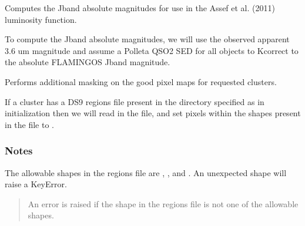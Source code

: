 \documentclass[letterpaper,12pt,english]{sphinxmanual}
\begin{document}
\begin{fulllineitems}
\begin{fulllineitems}
\label{\detokenize{api/selector:SPTclIRAGN.Pipeline_functions.SelectIRAGN.j_band_abs_mag}}
\pysigstartsignatures
{}
\pysigstopsignatures
\sphinxAtStartPar
Computes the J\sphinxhyphen{}band absolute magnitudes for use in the Assef et al. (2011) luminosity function.

\sphinxAtStartPar
To compute the J\sphinxhyphen{}band absolute magnitudes, we will use the observed apparent 3.6 um magnitude and assume a
Polleta  QSO2 SED for all objects to K\sphinxhyphen{}correct to the absolute FLAMINGOS J\sphinxhyphen{}band magnitude.

\end{fulllineitems}


\begin{fulllineitems}
\label{\detokenize{api/selector:SPTclIRAGN.Pipeline_functions.SelectIRAGN.object_mask}}
\pysigstartsignatures
{}
\pysigstopsignatures
\sphinxAtStartPar
Performs additional masking on the good pixel maps for requested clusters.

\sphinxAtStartPar
If a cluster has a DS9 regions file present in the directory specified as  in initialization
then we will read in the file, and set pixels within the shapes present in the file to .
\subsubsection*{Notes}

\sphinxAtStartPar
The allowable shapes in the regions file are , , and . An unexpected shape will raise a
KeyError.
\begin{quote}\begin{description}
\sphinxAtStartPar
{} \textendash{} An error is raised if the shape in the regions file is not one of the allowable shapes.


\end{description}
\end{quote}
\end{fulllineitems}
\end{fulllineitems}
\end{document}
